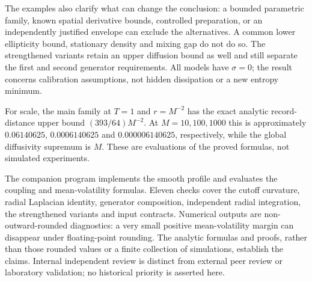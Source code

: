 The examples also clarify what can change the conclusion: a bounded
parametric family, known spatial derivative bounds, controlled preparation,
or an independently justified envelope can exclude the alternatives.
A common lower ellipticity bound, stationary density and mixing gap do
not do so. The strengthened variants retain an upper diffusion bound as
well and still separate the first and second generator requirements.
All models have $\sigma=0$; the result concerns calibration assumptions,
not hidden dissipation or a new entropy minimum.

For scale, the main family at $T=1$ and $r=M^{-2}$ has the exact analytic
record-distance upper bound $(393/64)M^{-2}$. At $M=10,100,1000$ this is
approximately $0.06140625$, $0.0006140625$ and $0.000006140625$,
respectively, while the global diffusivity supremum is $M$.
These are evaluations of the proved formulas, not simulated experiments.

The companion program implements the smooth profile and evaluates the
coupling and mean-volatility formulas. Eleven checks cover the cutoff
curvature, radial Laplacian identity, generator composition, independent
radial integration, the strengthened variants and input contracts.
Numerical outputs are non-outward-rounded diagnostics: a very small
positive mean-volatility margin can disappear under floating-point
rounding. The analytic formulas and proofs, rather than those rounded
values or a finite collection of simulations, establish the claims.
Internal independent review is distinct from external peer review or
laboratory validation; no historical priority is asserted here.
